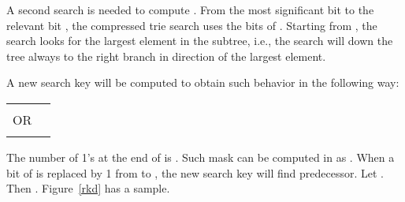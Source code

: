 \documentclass[11pt]{article}
\begin{document}
A second search is needed to compute . From the most significant bit to the relevant bit , the compressed trie search uses the bits of . Starting from , the search looks for the largest element in the subtree, i.e., the search will down the tree always to the right branch in direction of the largest element.

A new search key  will be computed to obtain such behavior in the following way:




\begin{tabular}{rr}
& \\
OR &   \\ \hline
&
\end{tabular}

The number of 1’s at the end of  is . Such mask can be computed in  as .
When a bit of  is replaced by 1 from  to , the new search key will find  predecessor. Let . Then . Figure~\ref{rkd} has a sample.
\end{document}
